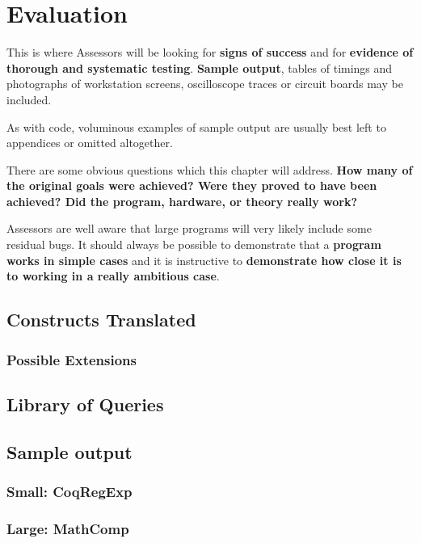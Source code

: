 \chapter{Evaluation}
\label{chapter:evaluation}

{\sf \color{red}
  This is where Assessors will be looking for \textbf{signs of success} and for
  \textbf{evidence of thorough and systematic testing}. \textbf{Sample output},
  tables of timings and photographs of workstation screens, oscilloscope traces
  or circuit boards may be included. 

  As with code, voluminous examples of sample output are usually best left to
  appendices or omitted altogether. 

  There are some obvious questions which this chapter will address. \textbf{How
  many of the original goals were achieved? Were they proved to have been
  achieved? Did the program, hardware, or theory really work?} 

  Assessors are well aware that large programs will very likely include some
  residual bugs. It should always be possible to demonstrate that a
  \textbf{program works in simple cases} and it is instructive to
  \textbf{demonstrate how close it is to working in a really ambitious case}. 
}

\section{Constructs Translated}

\subsection{Possible Extensions}

\section{Library of Queries}

\section{Sample output}
\subsection{Small: CoqRegExp}

\subsection{Large: MathComp}

